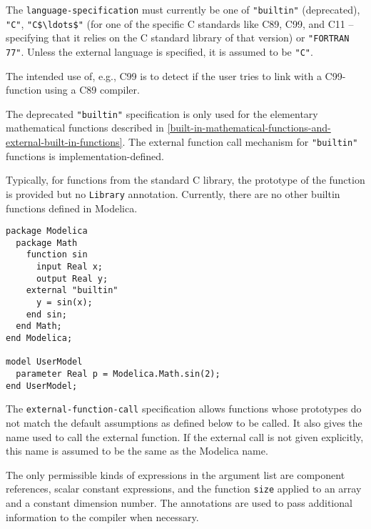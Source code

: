 The {\lstinline[language=grammar]!language-specification!} must currently be one of {\lstinline!"builtin"!} (deprecated), {\lstinline!"C"!}, {\lstinline!"C$\ldots$"!} (for one of the specific C standards like C89, C99, and C11 -- specifying that it relies on the C standard library of that version) or {\lstinline!"FORTRAN 77"!}.
Unless the external language is specified, it is assumed to be {\lstinline!"C"!}.

\begin{nonnormative}
The intended use of, e.g., C99 is to detect if the user tries to link with a C99-function using a C89 compiler.
\end{nonnormative}

The deprecated {\lstinline!"builtin"!} specification is only used for the elementary mathematical functions described in \cref{built-in-mathematical-functions-and-external-built-in-functions}.
The external function call mechanism for {\lstinline!"builtin"!} functions is implementation-defined.

\begin{nonnormative}
Typically, for functions from the standard C library, the prototype of the function is provided but no {\lstinline!Library!} annotation.
Currently, there are no other builtin functions defined in Modelica.
\end{nonnormative}

\begin{example}
\begin{lstlisting}[language=modelica]
package Modelica
  package Math
    function sin
      input Real x;
      output Real y;
    external "builtin"
      y = sin(x);
    end sin;
  end Math;
end Modelica;

model UserModel
  parameter Real p = Modelica.Math.sin(2);
end UserModel;
\end{lstlisting}
\end{example}

The {\lstinline[language=grammar]!external-function-call!} specification allows functions whose prototypes do not match the default assumptions as defined below to be called.
It also gives the name used to call the external function.
If the external call is not given explicitly, this name is assumed to be the same as the Modelica name.

The only permissible kinds of expressions in the argument list are component references, scalar constant expressions, and the function {\lstinline!size!} applied to an array and a constant dimension number.
The annotations are used to pass additional information to the compiler when necessary.

